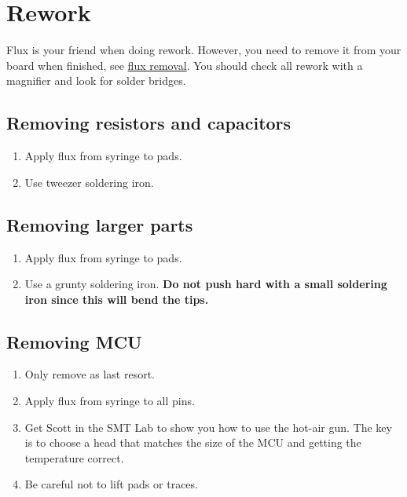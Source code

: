 \chapter{Rework}
\label{rework}


Flux is your friend when doing rework.  However, you need to remove it
from your board when finished, see \hyperref[flux removal]{flux
  removal}.  You should check all rework with a magnifier and look for
solder bridges.


\section{Removing resistors and capacitors}

\begin{enumerate}
\item Apply flux from syringe to pads.

\item Use tweezer soldering iron.
\end{enumerate}


\section{Removing larger parts}


\begin{enumerate}
\item Apply flux from syringe to pads.

\item Use a grunty soldering iron.  \textbf{Do not push hard with a
  small soldering iron since this will bend the tips.}
\end{enumerate}



\section{Removing MCU}

\begin{enumerate}
\item Only remove as last resort.

\item Apply flux from syringe to all pins.

\item Get Scott in the SMT Lab to show you how to use the hot-air gun.
  The key is to choose a head that matches the size of the MCU and
  getting the temperature correct.

\item Be careful not to lift pads or traces.
\end{enumerate}



